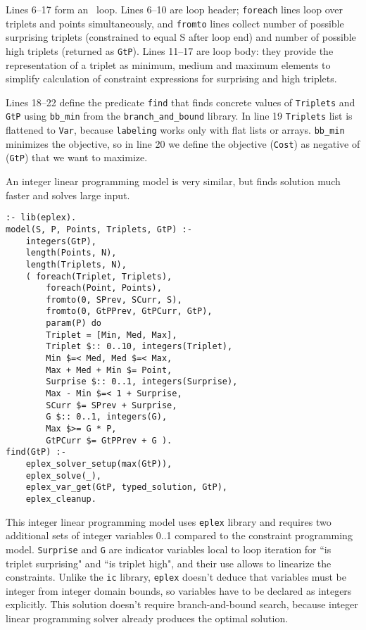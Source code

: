 \documentclass{acm_proc_article-sp}
\begin{document}
Lines 6--17 form an \eclipse\ loop. Lines 6--10 are loop header; \texttt{foreach} lines loop over triplets and points simultaneously, and \texttt{fromto} lines collect number of possible surprising triplets (constrained to equal S after loop end) and number of possible high triplets (returned as \texttt{GtP}). Lines 11--17 are loop body: they provide the representation of a triplet as minimum, medium and maximum elements to simplify calculation of constraint expressions for surprising and high triplets.

Lines 18--22 define the predicate \texttt{find} that finds concrete values of \texttt{Triplets} and \texttt{GtP} using \texttt{bb\_min} from the \texttt{branch\_and\_bound} library.
In line 19 \texttt{Triplets} list is flattened to \texttt{Var}, because \texttt{labeling} works only with flat lists or arrays.
\texttt{bb\_min} minimizes the objective, so in line 20 we define the objective (\texttt{Cost}) as negative of (\texttt{GtP}) that we want to maximize.

An integer linear programming model is very similar, but finds solution much faster and solves large input.

\begin{lstlisting}[caption={Integer programming solution for ``Dancing With the Googlers''}]
:- lib(eplex).
model(S, P, Points, Triplets, GtP) :-
    integers(GtP),
    length(Points, N),
    length(Triplets, N),
    ( foreach(Triplet, Triplets), 
        foreach(Point, Points), 
        fromto(0, SPrev, SCurr, S), 
        fromto(0, GtPPrev, GtPCurr, GtP), 
        param(P) do
        Triplet = [Min, Med, Max], 
        Triplet $:: 0..10, integers(Triplet),
        Min $=< Med, Med $=< Max,
        Max + Med + Min $= Point,
        Surprise $:: 0..1, integers(Surprise),
        Max - Min $=< 1 + Surprise,
        SCurr $= SPrev + Surprise,
        G $:: 0..1, integers(G),
        Max $>= G * P,
        GtPCurr $= GtPPrev + G ).
find(GtP) :-
    eplex_solver_setup(max(GtP)),
    eplex_solve(_),
    eplex_var_get(GtP, typed_solution, GtP),
    eplex_cleanup.
\end{lstlisting}

This integer linear programming model uses \texttt{eplex} library and requires two additional sets of integer variables 0..1 compared to the constraint programming model. 
\texttt{Surprise} and \texttt{G} are indicator variables local to loop iteration for ``is triplet surprising" and ``is triplet high", and their use allows to linearize the constraints. 
Unlike the \texttt{ic} library, \texttt{eplex} doesn't deduce that variables must be integer from integer domain bounds, so variables have to be declared as integers explicitly.
This solution doesn't require branch-and-bound search, because integer linear programming solver already produces the optimal solution. 
\end{document}
